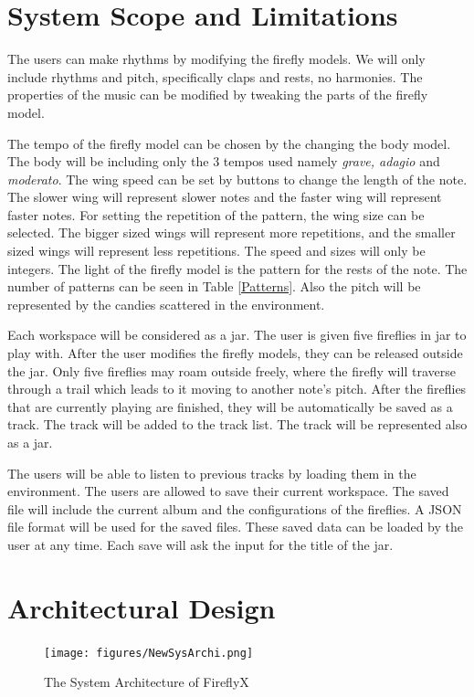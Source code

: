 \section{System Scope and Limitations}
The users can make rhythms by modifying the firefly models. We will only include rhythms and pitch, specifically claps and rests, no harmonies. The properties of the music can be modified by tweaking the parts of the firefly model.

The tempo of the firefly model can be chosen by the changing the body model. The body will be including only the 3 tempos used namely \textit{grave, adagio} and \textit{moderato}. The wing speed can be set by buttons to change the length of the note. The slower wing will represent slower notes and the faster wing will represent faster notes. For setting the repetition of the pattern, the wing size can be selected. The bigger sized wings will represent more repetitions, and the smaller sized wings will represent less repetitions. The speed and sizes will only be integers. The light of the firefly model is the pattern for the rests of the note. The number of patterns can be seen in Table \ref{Patterns}. Also the pitch will be represented by the candies scattered in the environment. 

Each workspace will be considered as a jar. The user is given five fireflies in jar to play with. After the user modifies the firefly models, they can be released outside the jar. Only five fireflies may roam outside freely, where the firefly will traverse through a trail which leads to it moving to another note's pitch. After the fireflies that are currently playing are finished, they will be automatically be saved as a track. The track will be added to the track list. The track will be represented also as a jar.

The users will be able to listen to previous tracks by loading them in the environment. The users are allowed to save their current workspace. The saved file will include the current album and the configurations of the fireflies. A JSON file format will be used for the saved files. These saved data can be loaded by the user at any time. Each save will ask the input for the title of the jar.

\section{Architectural Design}

\begin{figure} [H]
    \centering
    \texttt{[image: figures/NewSysArchi.png]}
    \caption{The System Architecture of FireflyX}
    \label{fig:sysarchi}
\end{figure}

